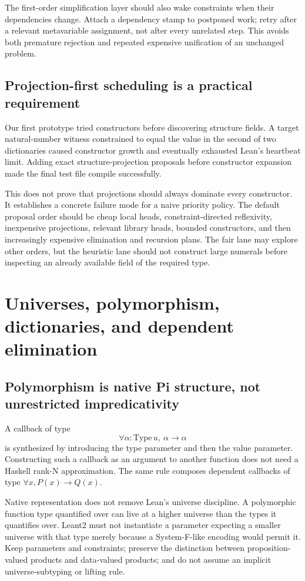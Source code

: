 The first-order simplification layer should also wake constraints when their dependencies change. Attach a dependency stamp to postponed work; retry after a relevant metavariable assignment, not after every unrelated step. This avoids both premature rejection and repeated expensive unification of an unchanged problem.

\subsection{Projection-first scheduling is a practical requirement}
Our first prototype tried constructors before discovering structure fields. A target natural-number witness constrained to equal the value in the second of two dictionaries caused constructor growth and eventually exhausted Lean's heartbeat limit. Adding exact structure-projection proposals before constructor expansion made the final test file compile successfully.

This does not prove that projections should always dominate every constructor. It establishes a concrete failure mode for a naive priority policy. The default proposal order should be cheap local heads, constraint-directed reflexivity, inexpensive projections, relevant library heads, bounded constructors, and then increasingly expensive elimination and recursion plans. The fair lane may explore other orders, but the heuristic lane should not construct large numerals before inspecting an already available field of the required type.

\section{Universes, polymorphism, dictionaries, and dependent elimination}
\label{sec:dependent}
\subsection{Polymorphism is native Pi structure, not unrestricted impredicativity}
A callback of type
\[
 \forall \alpha:\mathrm{Type}\,u,\ \alpha\to\alpha
\]
is synthesized by introducing the type parameter and then the value parameter. Constructing such a callback as an argument to another function does not need a Haskell rank-N approximation. The same rule composes dependent callbacks of type $\forall x, P(x)\to Q(x)$.

Native representation does not remove Lean's universe discipline. A polymorphic function type quantified over  can live at a higher universe than the types it quantifies over. Leant2 must not instantiate a parameter expecting a smaller universe with that type merely because a System-F-like encoding would permit it. Keep  parameters and constraints; preserve the distinction between proposition-valued products and data-valued products; and do not assume an implicit universe-subtyping or lifting rule.\cite{typesystem}

